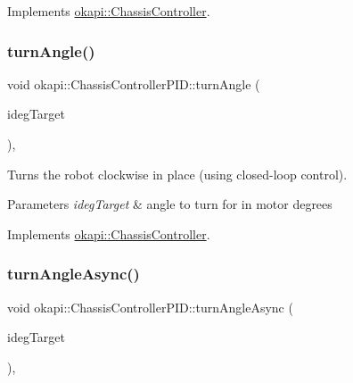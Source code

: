 Implements \mbox{\hyperlink{classokapi_1_1ChassisController_aab12308b3fad6793c007d7a33730a3f7}{okapi\+::\+Chassis\+Controller}}.

\mbox{\label{classokapi_1_1ChassisControllerPID_a140679da584fdc8bd057678e277742e7}} 
\subsubsection{\texorpdfstring{turnAngle()}{turnAngle()}\hspace{0.1cm}{\footnotesize\ttfamily [2/2]}}
{\footnotesize\ttfamily void okapi\+::\+Chassis\+Controller\+P\+I\+D\+::turn\+Angle (\begin{DoxyParamCaption}\item[{double}]{ideg\+Target }\end{DoxyParamCaption})\hspace{0.3cm}{\ttfamily [override]}, {\ttfamily [virtual]}}

Turns the robot clockwise in place (using closed-\/loop control).


\begin{DoxyCode}{0}
\DoxyCodeLine{\textcolor{comment}{// Turn clockwise by spinning the motors 200 degrees}}
\end{DoxyCode}



\begin{DoxyParams}{Parameters}
{\em ideg\+Target} & angle to turn for in motor degrees \\
\hline
\end{DoxyParams}


Implements \mbox{\hyperlink{classokapi_1_1ChassisController_a6aca227e35ececd02eed1cc42d09ad1d}{okapi\+::\+Chassis\+Controller}}.

\mbox{\label{classokapi_1_1ChassisControllerPID_a391c12c7b3cb5461cd28c4aebc4aeab0}} 
\subsubsection{\texorpdfstring{turnAngleAsync()}{turnAngleAsync()}\hspace{0.1cm}{\footnotesize\ttfamily [1/2]}}
{\footnotesize\ttfamily void okapi\+::\+Chassis\+Controller\+P\+I\+D\+::turn\+Angle\+Async (\begin{DoxyParamCaption}\item[{Q\+Angle}]{ideg\+Target }\end{DoxyParamCaption})\hspace{0.3cm}{\ttfamily [override]}, {\ttfamily [virtual]}}

